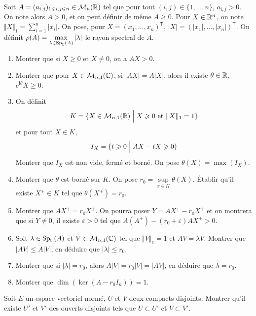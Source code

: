 \documentclass[12pt]{article}
\begin{document}
\begin{exercise}
	Soit $A=(a_{i,j})_{1\leqslant i,j\leqslant n}\in\mathcal{M}_{n}(\mathbb{R})$ tel que pour tout $(i,j)\in\{1,\dots,n\}$, $a_{i,j}>0$. On note alors $A>0$, et on peut définir de même $A\geqslant0$. Pour $X\in\mathbb{R}^{n}$, on note $\Vert X\Vert_{1}=\sum_{i=1}^{n}\vert x_{i}\vert$. On pose, pour $X=(x_{1},\dots,x_{n})^{\mathsf{T}}$, $\vert X\vert=(\vert x_{1}\vert,\dots,\vert x_{n}\vert)^{\mathsf{T}}$. 
	On définit $\rho(A)=\max\limits_{\lambda\in\operatorname{Sp}_{\mathbb{C}}(A)}\vert\lambda\vert$ le rayon spectral de $A$.
	\begin{enumerate}
		\item Montrer que si $X\geqslant0$ et $X\neq0$, on a $AX>0$.
		\item Montrer que pour $X\in\mathcal{M}_{n,1}(\mathbb{C})$, si $\vert AX\vert=A\vert X\vert$, alors il existe $\theta\in\mathbb{R}$, $e^{\mathrm{i}\theta}X\geqslant0$.
		\item On définit 
		$$K=\{X\in\mathcal{M}_{n,1}(\mathbb{R})\Bigm| X\geqslant0\text{ et }\Vert X\Vert_{1}=1\}$$
		et pour tout $X\in K$, 
		$$I_{X}=\{t\geqslant0\Bigm|AX-tX\geqslant0\}$$
		Montrer que $I_{X}$ est non vide, fermé et borné. On pose $\theta(X)=\max(I_{X})$.
		\item Montrer que $\theta$ est borné sur $K$. On pose $r_{0}=\sup\limits_{x\in K}\theta(X)$. Établir qu'il existe $X^{+}\in K$ tel que $\theta(X^{+})=r_{0}$.
		\item Montrer que $AX^{+}=r_{0}X^{+}$. On pourra poser $Y=AX^{+}-r_{0}X^{+}$ et on montrera que si $Y\neq0$, il existe $\varepsilon>0$ tel que $A(A^{+})-(r_{0}+\varepsilon)AX^{+}>0$.
		\item Soit $\lambda\in\operatorname{Sp}_{\mathbb{C}}(A)$ et $V\in\mathcal{M}_{n,1}(\mathbb{C})$ tel que $\Vert V\Vert_{1}=1$ et $AV=\lambda V$. Montrer que $\vert AV\vert\leqslant A\vert V\vert$, en déduire que $\vert\lambda\vert\leqslant r_{0}$.
		\item Montrer que si $\vert\lambda\vert=r_{0}$, alors $A\vert V\vert=r_{0}\vert V\vert=\vert AV\vert$, en déduire que $\lambda=r_{0}$.
		\item Montrer que $\dim(\ker(A-r_{0}I_{n}))=1$.
	\end{enumerate}
\end{exercise}

\begin{exercise}
	Soit $E$ un espace vectoriel normé, $U$ et $V$ deux compacts disjoints. Montrer qu'il existe $U'$ et $V'$ des ouverts disjoints tels que $U\subset U'$ et $V\subset V'$.
\end{exercise}
\end{document}
